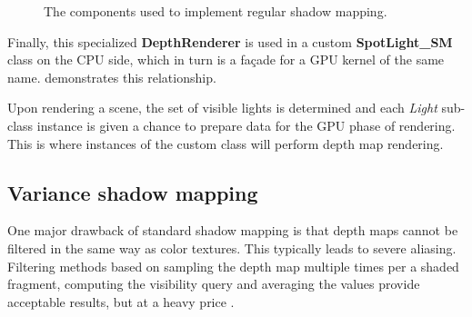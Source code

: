 \begin{figure}[ht!]
  \centering
    \caption[Shadow mapping components]{The components used to implement regular shadow mapping.}
  \label{fig:ShadowMappingUML}
\end{figure}

Finally, this specialized \textbf{DepthRenderer} is used in a custom \textbf{SpotLight\_SM} class on the CPU side, which in turn is a façade for a GPU kernel of the same name.  demonstrates this relationship.

Upon rendering a scene, the set of visible lights is determined and each \emph{Light} sub-class instance is given a chance to prepare data for the GPU phase of rendering. This is where instances of the custom class will perform depth map rendering.

\subsection{Variance shadow mapping}

One major drawback of standard shadow mapping is that depth maps cannot be filtered in the same way as color textures. This typically leads to severe aliasing. Filtering methods based on sampling the depth map multiple times per a shaded fragment, computing the visibility query and averaging the values provide acceptable results, but at a heavy price \cite{advancedSoftShadowMapping}.


